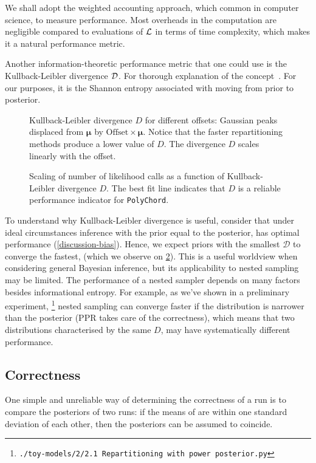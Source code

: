 \documentclass[usenatbib]{mnras}
\begin{document}
We shall adopt the weighted accounting approach, which common in
computer science, to measure performance. Most overheads in the
computation are negligible compared to evaluations of \({\cal L}\) in
terms of time complexity, which makes it a natural performance metric.

Another information-theoretic performance metric that one could use is
the Kullback-Leibler divergence \({\cal D}\). For thorough explanation
of the concept~\cite[see]{Kullback_1951}. For our purposes,
it is the Shannon entropy associated with moving from prior to posterior.

\begin{figure}
  
\caption{Kullback-Leibler divergence \(D\) for different offsets: Gaussian peaks displaced from \(\bm{\mu}\) by \(\text{Offset}\times \bm{\mu}\). Notice that the faster repartitioning methods produce a lower value of \(D\). The divergence \(D\) scales linearly with the offset.\label{fig:kl-d}}
\end{figure}

\begin{figure}
  
\caption{Scaling of number of likelihood calls as a function of Kullback-Leibler divergence \(D\). The best fit line indicates that \(D\) is a reliable performance indicator for \texttt{PolyChord}.\label{fig:kl-scaling}}
\end{figure}

To understand why Kullback-Leibler divergence is useful, consider
that under ideal circumstances inference with the prior equal to
the posterior, has optimal performance
(\cref{discussion-bias}). Hence, we expect priors with the
smallest \(\mathcal{D}\) to converge the fastest, (which we observe
on \cref{fig:kl-scaling}). This is a useful worldview when
considering general Bayesian inference, but its applicability to
nested sampling may be limited. The performance of a nested sampler
depends on many factors besides informational entropy. For example,
as we've shown in a preliminary experiment,
\footnote{\texttt{./toy-models/2/2.1 Repartitioning with power posterior.py}}
nested sampling can converge faster if the distribution is narrower than the posterior
(PPR takes care of the correctness), which means that two
distributions characterised by the same \(D\), may have
systematically different performance.

\subsection{Correctness}\label{sec:org59b0e37}
One simple and unreliable way of determining the correctness of a
run is to compare the posteriors of two runs: if the means of are
within one standard deviation of each other, then the posteriors
can be assumed to coincide.
\end{document}
